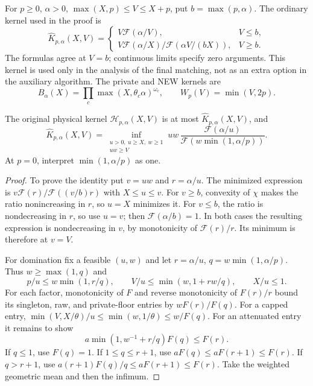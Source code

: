 For $p\ge0$, $\alpha>0$, $\max(X,p)\le V\le X+p$, put $b=\max(p,\alpha)$.
The ordinary kernel used in the proof is
\begin{equation}\label{simp:strong-kernel}
 \widehat K_{p,\alpha}(X,V)=
 \begin{cases}
 V\mathcal F(\alpha/V),&V\le b,\\
 V\mathcal F(\alpha/X)/\mathcal F(\alpha V/(bX)),&V\ge b.
 \end{cases}
\end{equation}
The formulas agree at $V=b$; continuous limits specify zero arguments.
This kernel is used only in the analysis of the final matching, not as an
extra option in the auxiliary algorithm.  The private and NEW kernels are
\[
 B_\alpha(X)=\prod_c\max(X,\theta_c\alpha)^{\omega_c},
 \qquad W_p(V)=\min(V,2p).
\]

\begin{lemma}\label{simp:ordinary-envelope}
The original physical kernel $\mathcal H_{p,\alpha}(X,V)$ is at most
$\widehat K_{p,\alpha}(X,V)$, and
\[
 \widehat K_{p,\alpha}(X,V)=
 \inf_{\substack{u>0,\ u\ge X,\ w\ge1\\uw\ge V}}
 uw\,\frac{\mathcal F(\alpha/u)}
 {\mathcal F(w\min(1,\alpha/p))}.
\]
At $p=0$, interpret $\min(1,\alpha/p)$ as one.
\end{lemma}
\begin{proof}
To prove the identity put $v=uw$ and $r=\alpha/u$.  The minimized expression
is $v\mathcal F(r)/\mathcal F((v/b)r)$ with $X\le u\le v$.
For $v\ge b$, convexity of $\chi$ makes the ratio nonincreasing in $r$,
so $u=X$ minimizes it.  For $v\le b$, the ratio is nondecreasing in $r$,
so use $u=v$; then $\mathcal F(\alpha/b)=1$.
In both cases the resulting expression is nondecreasing in $v$, by
monotonicity of $\mathcal F(r)/r$.  Its minimum is therefore at $v=V$.

For domination fix a feasible $(u,w)$ and let
$r=\alpha/u$, $q=w\min(1,\alpha/p)$.  Thus $w\ge\max(1,q)$ and
\[
 p/u\le w\min(1,r/q),\qquad V/u\le\min(w,1+rw/q),\qquad X/u\le1.
\]
For each factor, monotonicity of $F$ and reverse monotonicity of $F(r)/r$
bound its singleton, raw, and private-floor entries by $wF(r)/F(q)$.
For a capped entry, $\min(V,X/\theta)/u\le\min(w,1/\theta)
\le w/F(q)$.  For an attenuated entry it remains to show
\[
 a\min(1,w^{-1}+r/q)F(q)\le F(r).
\]
If $q\le1$, use $F(q)=1$.  If $1\le q\le r+1$, use
$aF(q)\le aF(r+1)\le F(r)$.  If $q>r+1$, use
$a(r+1)F(q)/q\le aF(r+1)\le F(r)$.
Take the weighted geometric mean and then the infimum.
\end{proof}

